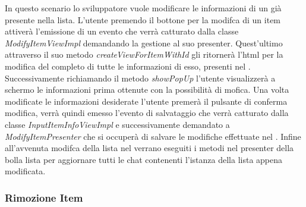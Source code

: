 In questo scenario lo sviluppatore vuole modificare le informazioni di un  già presente nella lista. L'utente premendo il bottone per la modifca di un item attiverà l'emissione di un evento che verrà catturato dalla classe \textit{ModifyItemViewImpl} demandando la gestione al suo presenter. Quest'ultimo attraverso il suo metodo \textit{createViewForItemWithId} gli ritornerà l'html per la modifica del  completo di tutte le informazioni di esso, presenti nel . Successivamente richiamando il metodo \textit{showPopUp} l'utente visualizzerà a schermo le informazioni prima ottenute con la possibilità di mofica. Una volta modificate le informazioni desiderate l'utente premerà il pulsante di conferma modifica, verrà quindi emesso l'evento di salvataggio che verrà catturato dalla classe \textit{InputItemInfoViewImpl} e successivamente demandato a \textit{ModifyItemPresenter} che si occuperà di salvare le modifiche effettuate nel . Infine all'avvenuta modifca della lista nel  verrano eseguiti i metodi nel presenter della bolla lista per aggiornare tutti le chat contenenti l'istanza della lista appena modificata. 

\subsubsection{Rimozione Item}

